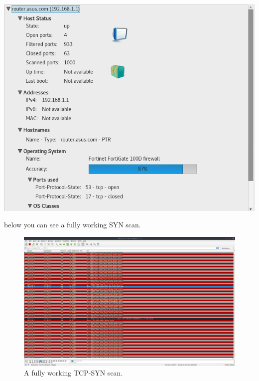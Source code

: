 \documentclass[titlepage]{article}
\begin{document}
\blindtext

\begin{center}
\includegraphics[width=\textwidth]{router_OS_scan.png}
\end{center}

\blindtext

below you can see a fully working SYN scan.

\begin{figure}[h]
  \centering
  \includegraphics[width=\textwidth]{working_syn_full_scan.png}
  \caption{A fully working TCP-SYN scan.}
\end{figure}

\blindtext
\end{document}
